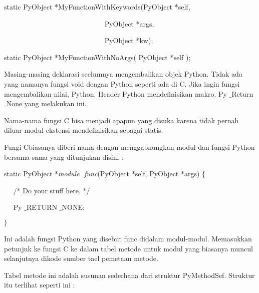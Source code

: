 \documentclass{wileySix}
\begin{document}
\begin{myEnumerate}
\begin{myEnumerate}
{\begin{myEnumerate}
\vspace{10pt}
\noindent 
{\fontsize{10pt}{10pt}\selectfont static PyObject *MyFunctionWithKeywords(PyObject *self,} \par
\noindent 
{\fontsize{10pt}{10pt}\selectfont ~~~~~~~~~~~~~~~~~~~~~~~~~~~~ PyObject *args,} \par
\noindent 
{\fontsize{10pt}{10pt}\selectfont ~~~~~~~~~~~~~~~~~~~~~~~~~~~~ PyObject *kw);} \par
\noindent 
\vspace{10pt}
\noindent 
{\fontsize{10pt}{10pt}\selectfont static PyObject *MyFunctionWithNoArgs( PyObject *self );} \par
\vspace{12pt}
\noindent 
\hspace*{0.5in} Masing-masing deklarasi seelumnya mengembalikan objek Python. Tidak ada yang namanya fungsi void dengan Python seperti ada di C. Jika ingin fungsi mengembalikan nilai, Python. Header Python mendefinisikan makro. Py $  \_  $Return $  \_  $None yang melakukan ini. \par
\noindent 
\hspace*{0.5in} Nama-nama fungsi C bisa menjadi apapun yang disuka karena tidak pernah diluar modul ekstensi mendefinisikan sebagai statis. \par
\noindent 
\hspace*{0.5in} Fungi Cbiasanya diberi nama dengan menggabnungkan modul dan fungsi Python bersama-sama yang ditunjukan disini : \par
\noindent 
static PyObject *\textit{module $  \_  $func}(PyObject *self, PyObject *args)  $  \{  $ \par
\noindent 
~~ /* Do your stuff here. */ \par
\noindent 
~~ Py $  \_  $RETURN $  \_  $NONE; \par
\noindent 
$  \}  $ \par
\vspace{12pt}
\vspace{12pt}
\noindent 
\hspace*{0.5in} Ini adalah fungsi Python yang disebut func didalam modul-modul. Memasukkan petunjuk ke fungsi C ke dalam tabel metode untuk modul yang biasanya muncul selanjutnya dikode sumber tael pemetaan metode. \par
\noindent 
\hspace*{0.5in} Tabel metode ini adalah susunan sederhana dari struktur PyMethodSef. Struktur itu terlihat seperti ini : \par
\noindent 

\end{myEnumerate}}
\end{myEnumerate}
\end{myEnumerate}
\end{document}
